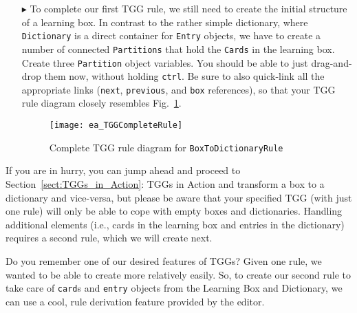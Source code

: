 \begin{enumerate}
\newpage

\item[$\blacktriangleright$] To complete our first TGG rule, we still need to create the initial structure of a learning box. In contrast to the rather simple
dictionary, where \texttt{Dictionary} is a direct container for \texttt{Entry} objects, we have to create a number of connected \texttt{Partitions} that hold
the \texttt{Cards} in the learning box. Create three \texttt{Partition} object variables. You should be able to just drag-and-drop them now, without holding
\texttt{ctrl}. Be sure to also quick-link all the appropriate links (\texttt{next}, \texttt{previous}, and \texttt{box} references), so that your TGG rule
diagram closely resembles Fig.~\ref{fig:boxtodictionaryrule_complete}.


\begin{figure}[htbp]
\begin{center}
  \texttt{[image: ea\_TGGCompleteRule]}
  \caption{Complete TGG rule diagram for \texttt{BoxToDictionaryRule}}
  \label{fig:boxtodictionaryrule_complete}
\end{center}
\end{figure}

\end{enumerate}

If you are in hurry, you can jump ahead and proceed to Section~\ref{sect:TGGs_in_Action}: TGGs in Action and transform a box to a dictionary and vice-versa, but
please be aware that your specified TGG (with just one rule) will only be able to cope with empty boxes and dictionaries. Handling additional elements
(i.e., cards in the learning box and entries in the dictionary) requires a second rule, which we will create next.

Do you remember one of our desired features of TGGs? Given one rule, we wanted to be able to create more relatively easily. So, to create our second rule to
take care of \texttt{card}s and \texttt{entry} objects from the Learning Box and Dictionary, we can use a cool, rule derivation feature provided by the editor.

